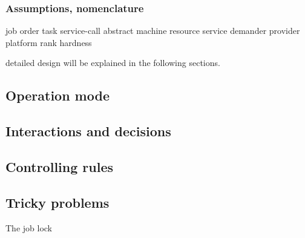 
\subsubsection{Assumptions, nomenclature} %
\label{ssub:assumptions_nomenclature}
job
order
task
service-call
abstract machine
resource
service
demander
provider
platform
rank
hardness

detailed design will be explained in the following sections.

\subsection{Operation mode} %
\label{sub:operation_mode}


\subsection{Interactions and decisions} %
\label{sub:interactions_and_decisions}


\subsection{Controlling rules} %
\label{sub:controlling_rules}


\subsection{Tricky problems} %
\label{sub:tricky_problems}
The job lock
